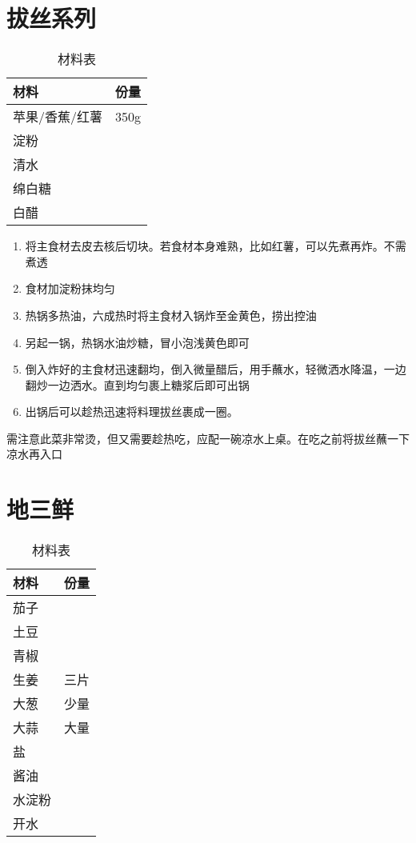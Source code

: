 \section{拔丝系列}

\begin{table}[H]
    \centering
    \begin{tabular}{|l||c|}\hline
     \textbf{材料}    &  \textbf{份量}\\ \hline\hline
    苹果/香蕉/红薯    &  350g  \\ \hline
    淀粉    &   \\ \hline
    清水    &  \\ \hline
    绵白糖    &  \\ \hline
    白醋 & \\ \hline 
    \end{tabular}
    \caption{材料表}
\end{table}

\begin{enumerate}
    \item 将主食材去皮去核后切块。若食材本身难熟，比如红薯，可以先煮再炸。不需煮透
    \item 食材加淀粉抹均匀
    \item 热锅多热油，六成热时将主食材入锅炸至金黄色，捞出控油
    \item 另起一锅，热锅水油炒糖，冒小泡浅黄色即可
    \item 倒入炸好的主食材迅速翻均，倒入微量醋后，用手蘸水，轻微洒水降温，一边翻炒一边洒水。直到均匀裹上糖浆后即可出锅
    \item 出锅后可以趁热迅速将料理拔丝裹成一圈。
    
\end{enumerate}
需注意此菜非常烫，但又需要趁热吃，应配一碗凉水上桌。在吃之前将拔丝蘸一下凉水再入口


\section{地三鲜}

\begin{table}[H]
    \centering
    \begin{tabular}{|l||c|}\hline
     \textbf{材料}    &  \textbf{份量}\\ \hline\hline
    茄子    &   \\ \hline
    土豆    &   \\ \hline
    青椒    &  \\ \hline
    生姜 & 三片\\ \hline 
    大葱 & 少量\\ \hline 
    大蒜 & 大量\\ \hline 
    盐 & \\ \hline 
    酱油 & \\ \hline 
    水淀粉 & \\ \hline 
    开水 & \\ \hline 
    \end{tabular}
    \caption{材料表}
\end{table}

